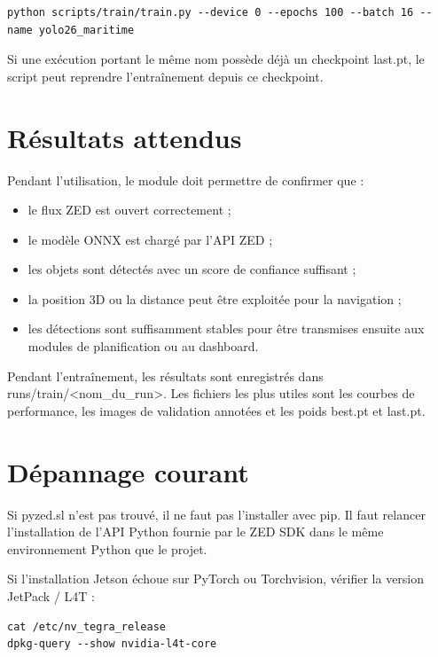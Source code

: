 \documentclass[11pt,letterpaper]{article}
\begin{document}
\begingroup
\footnotesize
\begin{verbatim}
python scripts/train/train.py --device 0 --epochs 100 --batch 16 --name yolo26_maritime
\end{verbatim}
\endgroup

Si une exécution portant le même nom possède déjà un checkpoint last.pt, le script peut reprendre l’entraînement depuis ce checkpoint.

\section{Résultats attendus}

Pendant l’utilisation, le module doit permettre de confirmer que :

\begin{itemize}
    \item le flux ZED est ouvert correctement ;
    \item le modèle ONNX est chargé par l’API ZED ;
    \item les objets sont détectés avec un score de confiance suffisant ;
    \item la position 3D ou la distance peut être exploitée pour la navigation ;
    \item les détections sont suffisamment stables pour être transmises ensuite aux modules de planification ou au dashboard.
\end{itemize}

Pendant l’entraînement, les résultats sont enregistrés dans runs/train/\textless nom\_du\_run\textgreater. Les fichiers les plus utiles sont les courbes de performance, les images de validation annotées et les poids best.pt et last.pt.

\section{Dépannage courant}

Si pyzed.sl n’est pas trouvé, il ne faut pas l’installer avec pip. Il faut relancer l’installation de l’API Python fournie par le ZED SDK dans le même environnement Python que le projet.

Si l’installation Jetson échoue sur PyTorch ou Torchvision, vérifier la version JetPack / L4T :

\begin{verbatim}
cat /etc/nv_tegra_release
dpkg-query --show nvidia-l4t-core
\end{verbatim}
\end{document}
